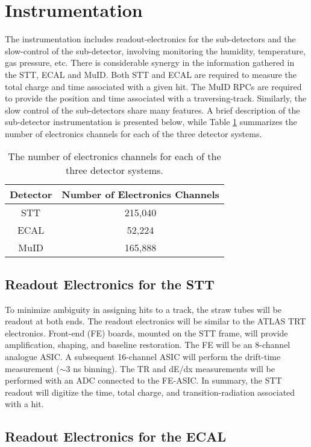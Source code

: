 \section{Instrumentation}

The instrumentation includes readout-electronics for the sub-detectors
and the slow-control of the sub-detector, involving monitoring the humidity, 
temperature, gas pressure, etc.
There is considerable synergy in the information gathered in the STT, ECAL and MuID.
Both STT and ECAL are required to measure the total charge and time associated with a 
given hit. The MuID RPCs are required to provide the position and time associated with 
a traversing-track. Similarly, the slow control of the sub-detectors
share many features. 
A brief description of the sub-detector instrumentation is presented below, while
Table \ref{elect_ch} summarizes the number of electronics channels for each of the
three detector systems. 

\begin{table}
\centering
  \caption{\label{elect_ch} The number of electronics channels for each of the
three detector systems.}
  \begin{tabular}{| c | c |}
    \hline
Detector&Number of Electronics Channels \\
    \hline
STT & 215,040 \\
ECAL & 52,224 \\
MuID & 165,888 \\
     \hline
  \end{tabular}
\end{table}

\subsection{Readout Electronics for the STT}

To minimize ambiguity in assigning hits to a track, the straw tubes will be readout 
at both ends. The readout electronics will be similar to the ATLAS TRT electronics. 
Front-end (FE) boards, mounted on the STT frame, will provide amplification, shaping, 
and baseline restoration. The FE will be an 8-channel analogue ASIC. A 
subsequent 16-channel ASIC will perform the drift-time measurement ($\sim 3$ ns binning). 
The TR and dE/dx measurements will be performed with an ADC connected to the FE-ASIC.
In summary, the STT readout will digitize the time, total charge, and 
transition-radiation associated with a hit.

\subsection{Readout Electronics for the ECAL}

